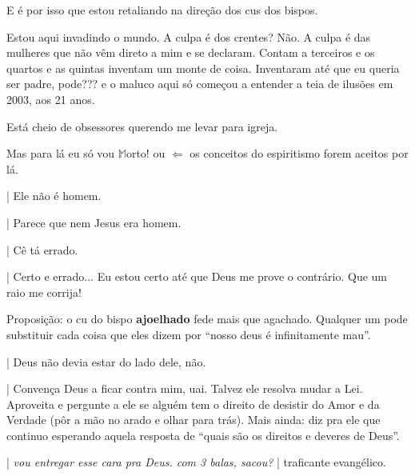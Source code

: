 \documentclass[12pt,a4paper]{article}
\begin{document}
				E \'e por isso que estou retaliando na dire\c{c}\~ao dos cus dos bispos. %

				Estou aqui invadindo o mundo. A culpa \'e dos crentes? N\~ao. A culpa \'e das mulheres\cite{x} que n\~ao v\^em direto a mim e se declaram. Contam a terceiros e os quartos e as quintas inventam um monte de coisa. Inventaram at\'e que eu queria ser padre\cite{x}, pode??? e o maluco aqui s\'o come\c{c}ou a entender a teia de ilus\~oes\cite{x} em 2003, aos 21 anos.

				Est\'a cheio de obsessores querendo me levar para igreja.

				Mas para l\'a eu s\'o vou $\mathbb{M}$orto! ou $\Leftarrow$ os conceitos do espiritismo forem aceitos por l\'a.

			\begin{flushright}
			\end{flushright}

| Ele n\~ao \'e homem.

| Parece que nem Jesus era homem.

			\begin{flushright}
			\end{flushright}

| C\^e t\'a errado.

| Certo e errado... Eu estou certo at\'e que Deus me prove o contr\'ario.
Que um raio me corrija!

			\begin{flushright}
			\end{flushright}

Proposi\c{c}\~ao: o cu do bispo \textbf{ajoelhado} fede mais que agachado.
Qualquer um pode substituir cada coisa que eles dizem por \textquotedblleft nosso deus \'e
infinitamente mau\textquotedblright.

| Deus n\~ao devia estar do lado dele, n\~ao.

| Conven\c{c}a Deus a ficar contra mim, uai. Talvez ele resolva mudar a Lei.
 Aproveita e pergunte a ele se algu\'em tem o direito de desistir do Amor e
 da Verdade (p\^or a m\~ao no arado e olhar para tr\'as). Mais ainda: diz pra
ele que continuo esperando aquela resposta de \textquotedblleft quais s\~ao os direitos e
deveres de Deus\textquotedblright.

			\begin{flushright}
			\end{flushright}

| \emph{vou entregar esse cara pra Deus. com 3 balas, sacou?} | traficante evang\'elico.
\end{document}
